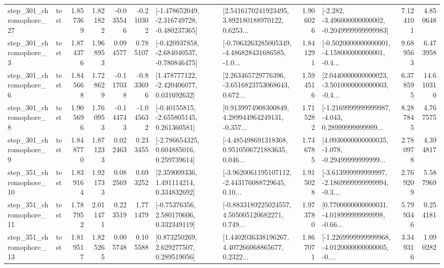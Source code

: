 \begin{tabular}{llrrrrllrlrr}
  step\_301\_chromophore\_27 &      test &      1.857369 &    1.821822 &     -0.035546 & -0.210302 &  [-1.478652049, -2.316749728, -0.480237365] &  [2.5416170241923495, 3.892180188970122, 0.6253... &       1.906026 &  [-2.282, -3.496000000000002, -0.2049999999999983] &            7.124101 &          4.850648 \\
   step\_301\_chromophore\_3 &      test &      1.874376 &    1.968953 &      0.094577 &  0.785107 &  [-0.420937858, -2.684040537, -0.780846475] &  [-0.7063263285005349, -4.486828431686585, -1.0... &       1.841291 &  [-0.5020000000000001, -4.158000000000001, -0.4... &            9.689563 &          6.473958 \\
   step\_301\_chromophore\_6 &      test &      1.845668 &    1.728629 &     -0.117038 & -0.833696 &    [1.478777122, -2.420406077, 0.031692632] &  [2.263465729776396, -3.6516823753068643, 0.672... &       1.594516 &  [2.0440000000000023, -3.5010000000000003, -0.4... &            6.378595 &         14.610310 \\
   step\_301\_chromophore\_8 &      test &      1.905696 &    1.760953 &     -0.144743 & -1.045632 &    [-0.40155815, -2.655805145, 0.261360581] &  [0.9139974908300849, 4.289944964249131, -0.357... &       1.715282 &  [-1.2169999999999987, -4.043, 0.28999999999999... &            8.287845 &          4.767575 \\
   step\_301\_chromophore\_9 &      test &      1.848770 &    1.871233 &      0.022463 &  0.233455 &    [-2.786654325, 0.604885016, 0.259739614] &  [-4.485498691318368, 0.9510506721883635, 0.046... &       1.746785 &  [4.0930000000000035, -1.078, -0.29499999999999... &            2.780978 &          4.394817 \\
  step\_351\_chromophore\_10 &      test &      1.839164 &    1.921733 &      0.082569 &  0.693252 &     [2.359009336, 1.491114214, 0.334832692] &  [-3.9620061195107112, -2.443176088729645, 0.10... &       1.915028 &  [-3.613999999999997, -2.1869999999999994, -0.3... &            2.769209 &          5.587969 \\
  step\_351\_chromophore\_11 &      test &      1.787952 &    2.011471 &      0.223519 &  1.771479 &     [-0.75376356, 2.580170606, 0.332349119] &  [-0.8833189225024557, 4.505005120682271, 0.749... &       1.973780 &  [0.7700000000000031, -4.018999999999998, -0.66... &            5.799346 &          0.254181 \\
  step\_351\_chromophore\_13 &      test &      1.819517 &    1.825265 &      0.005748 &  0.105588 &     [0.873250269, 2.629277507, 0.289519056] &  [1.4402036338196267, 4.407266068865677, 0.2322... &       1.867071 &  [-1.2269999999999968, -4.0120000000000005, -0.... &            3.349316 &          1.090282 \\

\end{tabular}
